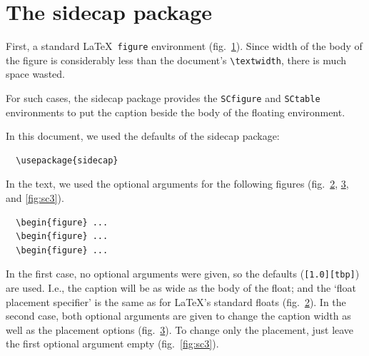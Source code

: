 \documentclass{article}
\begin{document}
\clearpage

\section{The sidecap package}

First, a standard \LaTeX\ \texttt{figure} environment
(fig.~\ref{fig:standard}).
Since width of the body of the figure is considerably less than
the document's \verb|\textwidth|, there is much space wasted.

\begin{figure}[h]
  \centering
  \caption[\SHORTCAPi]{\CAPi}
  \label{fig:standard}
\end{figure}

For such cases, the \textsf{sidecap} package provides the
\verb|SCfigure| and \verb|SCtable| environments to put the
caption beside the body of the floating environment.

In this document, we used the defaults of the \textsf{sidecap} package:
%
\begin{verbatim}
  \usepackage{sidecap}
\end{verbatim}
%
In the text, we used the optional arguments for the following figures
(fig.~\ref{fig:sc1}, \ref{fig:sc2}, and \ref{fig:sc3}).
%
\begin{verbatim}
  \begin{figure} ...
  \begin{figure} ...
  \begin{figure} ...
\end{verbatim}
%
In the first case, no optional arguments were given, so the defaults
(\verb|[1.0][tbp]|) are used. I.e., the caption will be as wide as
the body of the float; and the `float placement specifier' is the same
as for \LaTeX's standard floats (fig.~\ref{fig:sc1}).
In the second case, both optional arguments are given to change the
caption width as well as the placement options (fig.~\ref{fig:sc2}).
To change only the placement, just leave the first optional argument
empty (fig.~\ref{fig:sc3}).

\begin{figure}
  \caption[\SHORTCAPi]{\CAPi}
  \label{fig:sc1}
\end{figure}

\begin{figure}
  \caption[\SHORTCAPi]{\CAPi}
  \label{fig:sc2}
\end{figure}
\end{document}
